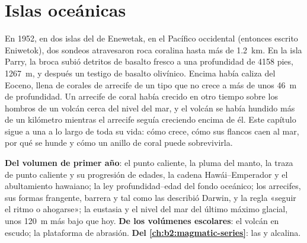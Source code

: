 \chapter{Islas oceánicas}\label{ch:b2:oceanic-islands}

En 1952, en dos islas del  de Enewetak, en el Pacífico occidental (entonces escrito Eniwetok), dos
sondeos atravesaron roca coralina hasta más de \qty{1.2}{km}. En la isla Parry, la broca
subió detritos de basalto fresco a una profundidad de 4158 pies, \qty{1267}{m}, y después un testigo de
basalto olivínico. Encima había caliza del Eoceno, llena de corales de arrecife de un tipo que no
crece a más de unos \qty{46}{m} de profundidad. Un arrecife de coral había crecido en otro tiempo sobre los hombros de un volcán cerca del
nivel del mar, y el volcán se había hundido más de un kilómetro mientras el arrecife seguía creciendo encima de
él. Este capítulo sigue a una  a lo largo de toda su vida: cómo crece, cómo sus flancos
caen al mar, por qué se hunde y cómo un anillo de coral puede sobrevivirla.

\begin{recall}
\textbf{Del volumen de primer año}: el punto caliente, la pluma del manto, la traza de punto caliente y su progresión de edades,
la cadena Hawái--Emperador y el abultamiento hawaiano; la ley profundidad--edad del fondo oceánico; los arrecifes,
sus formas frangente, barrera y  tal como las describió Darwin, y la regla «seguir el ritmo o
ahogarse»; la eustasia y el nivel del mar del último máximo glacial, unos \qty{120}{m} más bajo que
hoy. \textbf{De los volúmenes escolares}: el volcán en escudo; la plataforma de abrasión.
\textbf{Del \cref{ch:b2:magmatic-series}}: las  y alcalina.
\end{recall}

